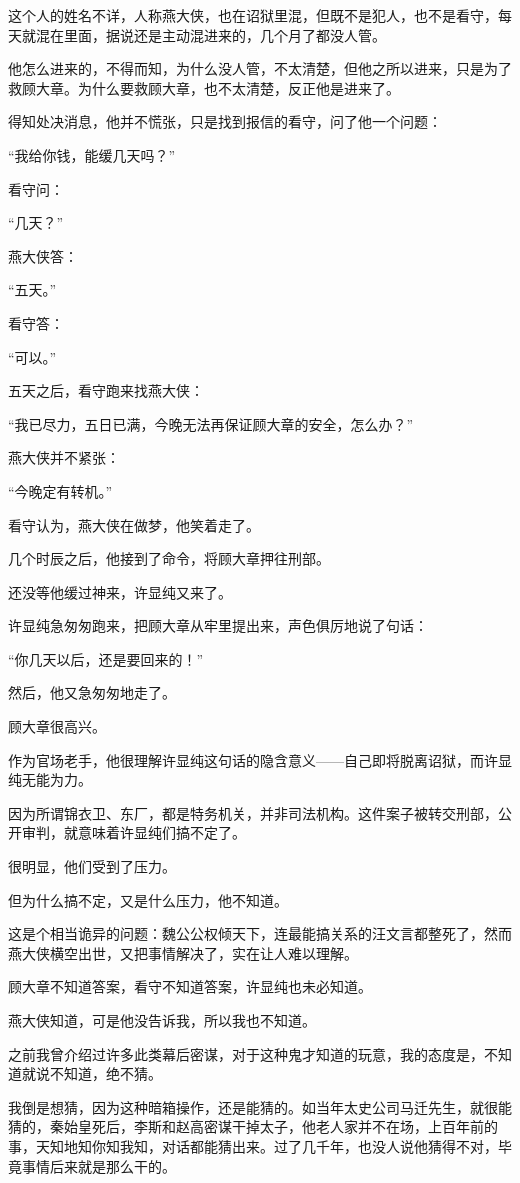 \begin{multicols}{\theparacolNo}
		这个人的姓名不详，人称燕大侠，也在诏狱里混，但既不是犯人，也不是看守，每天就混在里面，据说还是主动混进来的，几个月了都没人管。

		他怎么进来的，不得而知，为什么没人管，不太清楚，但他之所以进来，只是为了救顾大章。为什么要救顾大章，也不太清楚，反正他是进来了。

		得知处决消息，他并不慌张，只是找到报信的看守，问了他一个问题：

		“我给你钱，能缓几天吗？”

		看守问：

		“几天？”

		燕大侠答：

		“五天。”

		看守答：

		“可以。”

		五天之后，看守跑来找燕大侠：

		“我已尽力，五日已满，今晚无法再保证顾大章的安全，怎么办？”

		燕大侠并不紧张：

		“今晚定有转机。”

		看守认为，燕大侠在做梦，他笑着走了。

		几个时辰之后，他接到了命令，将顾大章押往刑部。

		还没等他缓过神来，许显纯又来了。

		许显纯急匆匆跑来，把顾大章从牢里提出来，声色俱厉地说了句话：

		“你几天以后，还是要回来的！”

		然后，他又急匆匆地走了。

		顾大章很高兴。

		作为官场老手，他很理解许显纯这句话的隐含意义——自己即将脱离诏狱，而许显纯无能为力。

		因为所谓锦衣卫、东厂，都是特务机关，并非司法机构。这件案子被转交刑部，公开审判，就意味着许显纯们搞不定了。

		很明显，他们受到了压力。

		但为什么搞不定，又是什么压力，他不知道。

		这是个相当诡异的问题：魏公公权倾天下，连最能搞关系的汪文言都整死了，然而燕大侠横空出世，又把事情解决了，实在让人难以理解。

		顾大章不知道答案，看守不知道答案，许显纯也未必知道。

		燕大侠知道，可是他没告诉我，所以我也不知道。

		之前我曾介绍过许多此类幕后密谋，对于这种鬼才知道的玩意，我的态度是，不知道就说不知道，绝不猜。

		我倒是想猜，因为这种暗箱操作，还是能猜的。如当年太史公司马迁先生，就很能猜的，秦始皇死后，李斯和赵高密谋干掉太子，他老人家并不在场，上百年前的事，天知地知你知我知，对话都能猜出来。过了几千年，也没人说他猜得不对，毕竟事情后来就是那么干的。


\end{multicols}

